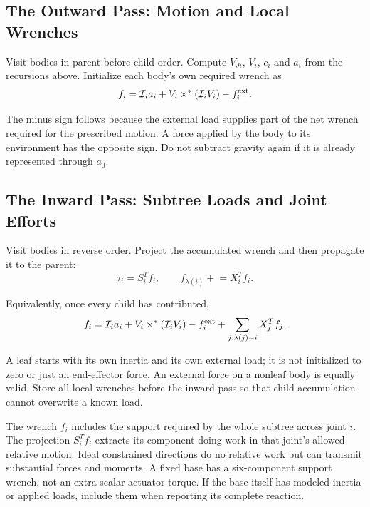 \subsection{The Outward Pass: Motion and Local Wrenches}

Visit bodies in parent-before-child order. Compute $V_{Ji}$, $V_i$, $c_i$ and $a_i$ from the recursions above. Initialize each body's own required wrench as
\begin{equation}
 f_i=\mathcal I_i a_i+V_i\times^*(\mathcal I_iV_i)-f_i^{\rm ext}.
 \label{eq:wrench_recursion}
\end{equation}

The minus sign follows because the external load supplies part of the net wrench required for the prescribed motion. A force applied by the body to its environment has the opposite sign. Do not subtract gravity again if it is already represented through $a_0$.

\subsection{The Inward Pass: Subtree Loads and Joint Efforts}

Visit bodies in reverse order. Project the accumulated wrench and then propagate it to the parent:
\begin{equation}
 \tau_i=S_i^T f_i,\qquad
 f_{\lambda(i)}\mathrel{+}=X_i^T f_i.
 \label{eq:joint_torque_extraction}
\end{equation}

Equivalently, once every child has contributed,
\begin{equation}
 f_i=\mathcal I_i a_i+V_i\times^*(\mathcal I_iV_i)-f_i^{\rm ext}
       +\sum_{j:\lambda(j)=i}X_j^Tf_j.
 \label{eq:wrench_recursion_tree}
\end{equation}

A leaf starts with its own inertia and its own external load; it is not initialized to zero or just an end-effector force. An external force on a nonleaf body is equally valid. Store all local wrenches before the inward pass so that child accumulation cannot overwrite a known load.

The wrench $f_i$ includes the support required by the whole subtree across joint $i$. The projection $S_i^Tf_i$ extracts its component doing work in that joint's allowed relative motion. Ideal constrained directions do no relative work but can transmit substantial forces and moments. A fixed base has a six-component support wrench, not an extra scalar actuator torque. If the base itself has modeled inertia or applied loads, include them when reporting its complete reaction.

